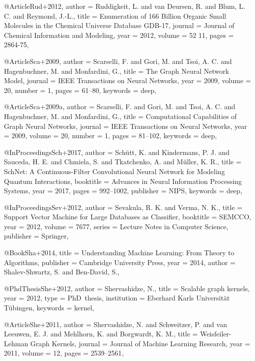 @Article{Rud+2012,
  author  = {Ruddigkeit, L. and van Deursen, R. and Blum, L. C. and Reymond, J.-L.},
  title   = {Enumeration of 166 Billion Organic Small Molecules in the Chemical Universe Database GDB-17},
  journal = {Journal of Chemical Information and Modeling},
  year    = {2012},
  volume  = {52 11},
  pages   = {2864-75},
}

@Article{Sca+2009,
  author   = {Scarselli, F. and Gori, M. and Tsoi, A. C. and Hagenbuchner, M. and Monfardini, G.},
  title    = {The Graph Neural Network Model},
  journal  = {IEEE Transactions on Neural Networks},
  year     = {2009},
  volume   = {20},
  number   = {1},
  pages    = {61--80},
  keywords = {deep},
}

@Article{Sca+2009a,
  author   = {Scarselli, F. and Gori, M. and Tsoi, A. C. and Hagenbuchner, M. and Monfardini, G.},
  title    = {Computational Capabilities of Graph Neural Networks},
  journal  = {IEEE Transactions on Neural Networks},
  year     = {2009},
  volume   = {20},
  number   = {1},
  pages    = {81--102},
  keywords = {deep},
}

@InProceedings{Sch+2017,
  author    = {Sch{\"{u}}tt, K. and Kindermans, P. J. and Sauceda, H. E. and Chmiela, S. and Tkatchenko, A. and M{\"{u}}ller, K. R.},
  title     = {{SchNet}: A Continuous-Filter Convolutional Neural Network for Modeling Quantum Interactions},
  booktitle = {Advances in Neural Information Processing Systems},
  year      = {2017},
  pages     = {992--1002},
  publisher = {NIPS},
  keywords  = {deep},
}

@InProceedings{Sev+2012,
  author    = {Sevakula, R. K. and Verma, N. K.},
  title     = {Support Vector Machine for Large Databases as Classifier},
  booktitle = {SEMCCO},
  year      = {2012},
  volume    = {7677},
  series    = {Lecture Notes in Computer Science},
  publisher = {Springer},
}

@Book{Sha+2014,
  title     = {Understanding Machine Learning: {F}rom Theory to Algorithms},
  publisher = {Cambridge University Press},
  year      = {2014},
  author    = {Shalev-Shwartz, S. and Ben-David, S.},
}

@PhdThesis{She+2012,
  author      = {Shervashidze, N.},
  title       = {Scalable graph kernels},
  year        = {2012},
  type        = {PhD~thesis},
  institution = {Eberhard Karls Universit\"{a}t T\"{u}bingen},
  keywords    = {kernel},
}

@Article{She+2011,
  author  = {Shervashidze, N. and Schweitzer, P. and van Leeuwen, E. J. and Mehlhorn, K. and Borgwardt, K. M.},
  title   = {Weisfeiler-{L}ehman Graph Kernels},
  journal = {Journal of Machine Learning Research},
  year    = {2011},
  volume  = {12},
  pages   = {2539--2561},
}

